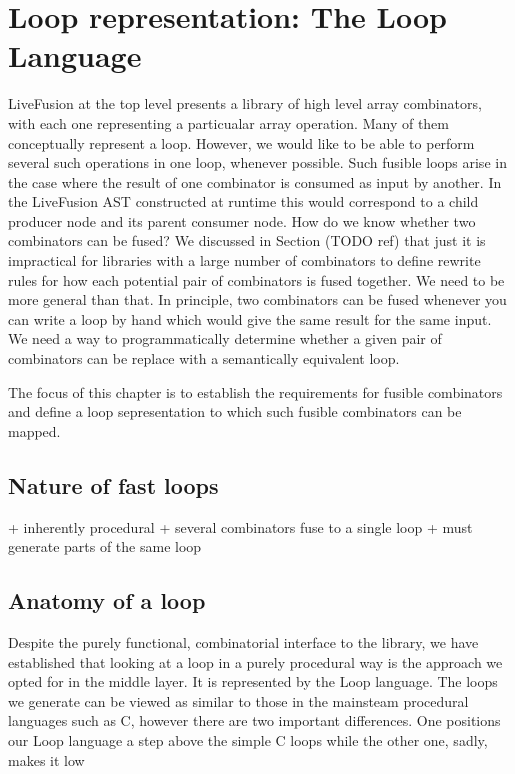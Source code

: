 

\section{Loop representation: The Loop Language}

LiveFusion at the top level presents a library of high level array combinators, with each one representing a particualar array operation. Many of them conceptually represent a loop. However, we would like to be able to perform several such operations in one loop, whenever possible. Such fusible loops arise in the case where the result of one combinator is consumed as input by another. In the LiveFusion AST constructed at runtime this would correspond to a child producer node and its parent consumer node. How do we know whether two combinators can be fused? We discussed in Section (TODO ref) that just it is impractical for libraries with a large number of combinators to define rewrite rules for how each potential pair of combinators is fused together. We need to be more general than that. In principle, two combinators can be fused whenever you can write a loop by hand which would give the same result for the same input. We need a way to programmatically determine whether a given pair of combinators can be replace with a semantically equivalent loop.

The focus of this chapter is to establish the requirements for fusible combinators and define a loop sepresentation to which such fusible combinators can be mapped.



\subsection{Nature of fast loops}

+ inherently procedural
+ several combinators fuse to a single loop
+ must generate parts of the same loop



\subsection{Anatomy of a loop}

Despite the purely functional, combinatorial interface to the library, we have established that looking at a loop in a purely procedural way is the approach we opted for in the middle layer. It is represented by the Loop language. The loops we generate can be viewed as similar to those in the mainsteam procedural languages such as C, however there are two important differences. One positions our Loop language a step above the simple C loops while the other one, sadly, makes it low

